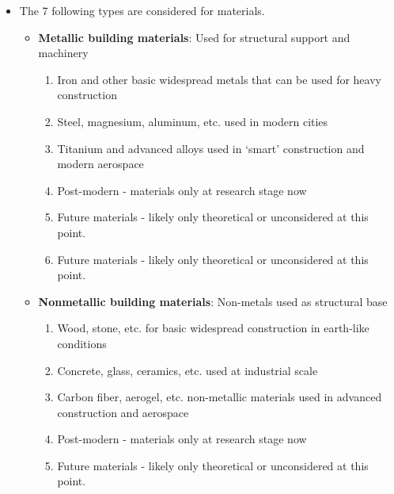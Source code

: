 \documentclass{article}
\begin{document}
\begin{itemize}
\begin{enumerate}
        \item \textbf{Post-modern}: nanomaterials, superconductors, etc. - modern research grade but not feasible at scale, likely allowing fusion, quantum computing, etc. if they became widely available
        \item \textbf{Future materials}: likely only theoretical or unconsidered at this point.
        \item \textbf{Future materials}: likely only theoretical or unconsidered at this point.
    \end{enumerate}
    \item The 7 following types are considered for materials.
    \begin{itemize}
        \item \textbf{Metallic building materials}: Used for structural support and machinery
        \begin{enumerate}
            \item Iron and other basic widespread metals that can be used for heavy construction
            \item Steel, magnesium, aluminum, etc. used in modern cities
            \item Titanium and advanced alloys used in `smart' construction and modern aerospace
            \item Post-modern - materials only at research stage now
            \item Future materials - likely only theoretical or unconsidered at this point.
            \item Future materials - likely only theoretical or unconsidered at this point.
        \end{enumerate}
        \item \textbf{Nonmetallic building materials}: Non-metals used as structural base 
        \begin{enumerate}
            \item Wood, stone, etc. for basic widespread construction in earth-like conditions
            \item Concrete, glass, ceramics, etc. used at industrial scale
            \item Carbon fiber, aerogel, etc. non-metallic materials used in advanced construction and aerospace
            \item Post-modern - materials only at research stage now
            \item Future materials - likely only theoretical or unconsidered at this point.

\end{enumerate}
\end{itemize}
\end{itemize}
\end{document}
